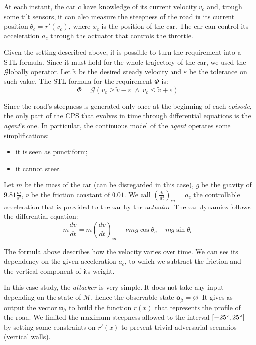 At each instant, the car $c$ have knowledge of its current velocity $v_c$ and, trough some tilt sensors, it can also measure the steepness of the road in its current position $\theta_c = r'(x_c)$, where $x_c$ is the position of the car.
The car can control its acceleration $a_c$ through the actuator that controls the throttle.

Given the setting described above, it is possible to turn the requirement into a STL formula.
Since it must hold for the whole trajectory of the car, we used the $\mathcal{G}$lobally operator.
Let $\tilde{v}$ be the desired steady velocity and $\varepsilon$ be the tolerance on such value.
The STL formula for the requirement $\Phi$ is:
$$ \Phi = \mathcal{G}(v_c \geq \tilde{v} - \varepsilon \; \wedge \; v_c \leq \tilde{v} + \varepsilon) $$

Since the road's steepness is generated only once at the beginning of each \textit{episode}, the only part of the CPS that evolves in time through differential equations is the \textit{agent}'s one.
In particular, the continuous model of the \textit{agent} operates some simplifications:
\begin{itemize}
  \item it is seen as punctiform;
  \item it cannot steer.
\end{itemize}

Let $m$ be the mass of the car (can be disregarded in this case), $g$ be the gravity of $9.81 \frac{m}{s^2}$, $\nu$ be the friction constant of $0.01$.
We call $\left( \frac{dv}{dt} \right)_{in} = a_c$ the controllable acceleration that is provided to the car by the \textit{actuator}.
The car dynamics follows the differential equation:
$$ m \frac{dv}{dt} = m \left( \frac{dv}{dt} \right)_{in} - \nu mg\cos\theta_c   - mg\sin\theta_c$$

The formula above describes how the velocity varies over time.
We can see its dependency on the given acceleration $a_c$, to which we subtract the friction and the vertical component of its weight.

In this case study, the \textit{attacker} is very simple.
It does not take any input depending on the state of $\mathcal{M}$, hence the observable state $\textbf{o}_\beta = \varnothing$.
It gives as output the vector $\textbf{u}_\beta$ to build the function $r(x)$ that represents the profile of the road.
We limited the maximum steepness allowed to the interval $[-25\degree, 25\degree]$ by setting some constraints on $r'(x)$ to prevent trivial adversarial scenarios (vertical walls).

